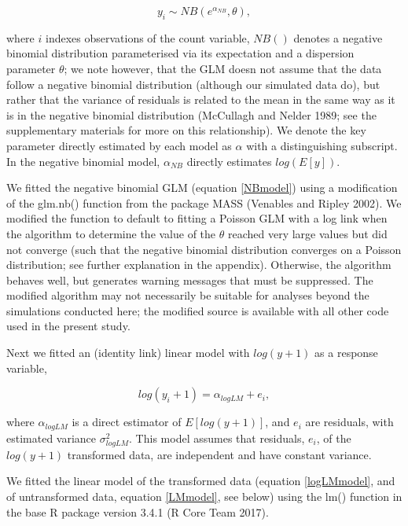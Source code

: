 \documentclass[]{article}
\begin{document}
\begin{equation} \label{NBmodel}
y_i \sim NB\left(e^{\alpha_{NB}},\theta\right), 
\end{equation}

where \(i\) indexes observations of the count variable,
\(NB\left(\right)\) denotes a negative binomial distribution
parameterised via its expectation and a dispersion parameter \(\theta\);
we note however, that the GLM doesn not assume that the data follow a
negative binomial distribution (although our simulated data do), but
rather that the variance of residuals is related to the mean in the same
way as it is in the negative binomial distribution (McCullagh and Nelder
1989; see the supplementary materials for more on this relationship). We
denote the key parameter directly estimated by each model as \(\alpha\)
with a distinguishing subscript. In the negative binomial model,
\(\alpha_{NB}\) directly estimates \(log(E[y])\).

We fitted the negative binomial GLM (equation \ref{NBmodel}) using a
modification of the glm.nb() function from the package MASS (Venables
and Ripley 2002). We modified the function to default to fitting a
Poisson GLM with a log link when the algorithm to determine the value of
the \(\theta\) reached very large values but did not converge (such that
the negative binomial distribution converges on a Poisson distribution;
see further explanation in the appendix). Otherwise, the algorithm
behaves well, but generates warning messages that must be suppressed.
The modified algorithm may not necessarily be suitable for analyses
beyond the simulations conducted here; the modified source is available
with all other code used in the present study.

Next we fitted an (identity link) linear model with \(log(y+1)\) as a
response variable,

\begin{equation}\label{logLMmodel}
log(y_i+1) = \alpha_{logLM} + e_i,
\end{equation}

where \(\alpha_{logLM}\) is a direct estimator of \(E[log(y+1)]\), and
\(e_i\) are residuals, with estimated variance \(\sigma^2_{logLM}\).
This model assumes that residuals, \(e_i\), of the \(log(y+1)\)
transformed data, are independent and have constant variance.

We fitted the linear model of the transformed data (equation
\ref{logLMmodel}, and of untransformed data, equation \ref{LMmodel}, see
below) using the lm() function in the base R package version 3.4.1 (R
Core Team 2017).
\end{document}
